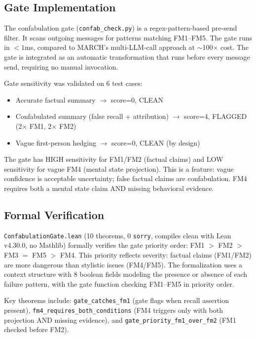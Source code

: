 \documentclass{article}
\begin{document}
\subsection{Gate Implementation}

The confabulation gate (\texttt{confab\_check.py}) is a regex-pattern-based pre-send filter. It scans outgoing messages for patterns matching FM1--FM5. The gate runs in $<1$ms, compared to MARCH's multi-LLM-call approach at $\sim$100$\times$ cost. The gate is integrated as an automatic transformation that runs before every message send, requiring no manual invocation.

Gate sensitivity was validated on 6 test cases:
\begin{itemize}
    \item Accurate factual summary $\to$ score=0, CLEAN
    \item Confabulated summary (false recall + attribution) $\to$ score=4, FLAGGED (2$\times$ FM1, 2$\times$ FM2)
    \item Vague first-person hedging $\to$ score=0, CLEAN (by design)
\end{itemize}

The gate has HIGH sensitivity for FM1/FM2 (factual claims) and LOW sensitivity for vague FM4 (mental state projection). This is a feature: vague confidence is acceptable uncertainty; false factual claims are confabulation. FM4 requires both a mental state claim AND missing behavioral evidence.

\subsection{Formal Verification}

\texttt{ConfabulationGate.lean} (10 theorems, 0 \texttt{sorry}, compiles clean with Lean v4.30.0, no Mathlib) formally verifies the gate priority order: FM1 $>$ FM2 $>$ FM3 $=$ FM5 $>$ FM4. This priority reflects severity: factual claims (FM1/FM2) are more dangerous than stylistic issues (FM4/FM5). The formalization uses a context structure with 8 boolean fields modeling the presence or absence of each failure pattern, with the gate function checking FM1--FM5 in priority order.

Key theorems include: \texttt{gate\_catches\_fm1} (gate flags when recall assertion present), \texttt{fm4\_requires\_both\_conditions} (FM4 triggers only with both projection AND missing evidence), and \texttt{gate\_priority\_fm1\_over\_fm2} (FM1 checked before FM2).
\end{document}

